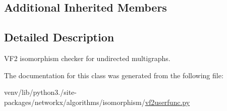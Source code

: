 \subsection*{Additional Inherited Members}


\subsection{Detailed Description}
\begin{DoxyVerb}VF2 isomorphism checker for undirected multigraphs.\end{DoxyVerb}
 

The documentation for this class was generated from the following file\+:\begin{DoxyCompactItemize}
\item 
venv/lib/python3./site-\/packages/networkx/algorithms/isomorphism/\hyperlink{vf2userfunc_8py}{vf2userfunc.\+py}\end{DoxyCompactItemize}
